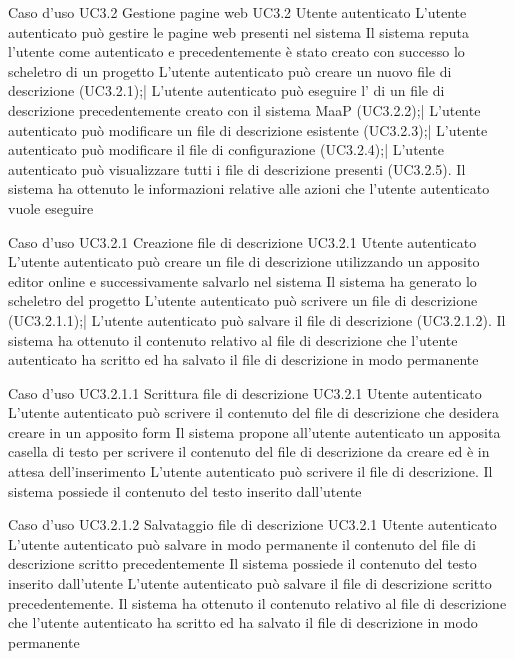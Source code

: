 \UCtitle
{Caso d'uso UC3.2}
{Gestione pagine web}
\UC
{UC3.2}
{Utente autenticato}
{L'utente autenticato può gestire le pagine web presenti nel sistema}
{Il sistema reputa l'utente come autenticato e precedentemente è stato creato con successo lo scheletro di un progetto}
\scenario
{L'utente autenticato può creare un nuovo file di descrizione (UC3.2.1);|
L'utente autenticato può eseguire l' di un file di descrizione precedentemente creato con il sistema MaaP (UC3.2.2);|
L'utente autenticato può modificare un file di descrizione esistente (UC3.2.3);|
L'utente autenticato può modificare il file di configurazione (UC3.2.4);|
L'utente autenticato può visualizzare tutti i file di descrizione presenti (UC3.2.5).
}
\post
{Il sistema ha ottenuto le informazioni relative alle azioni che l'utente autenticato vuole eseguire}


\UCtitle
{Caso d'uso UC3.2.1}
{Creazione file di descrizione}
\UC
{UC3.2.1}
{Utente autenticato}
{L'utente autenticato può creare un file di descrizione utilizzando un apposito editor online e successivamente salvarlo nel sistema}
{Il sistema ha generato lo scheletro del progetto}
\scenario
{L'utente autenticato può scrivere un file di descrizione (UC3.2.1.1);|
L'utente autenticato può salvare il file di descrizione (UC3.2.1.2).
}
\post
{Il sistema ha ottenuto il contenuto relativo al file di descrizione che l'utente autenticato ha scritto ed ha salvato il file di descrizione in modo permanente}

\UCtitle
{Caso d'uso UC3.2.1.1}
{Scrittura file di descrizione}
\UC
{UC3.2.1}
{Utente autenticato}
{L'utente autenticato può scrivere il contenuto del file di descrizione che desidera creare in un apposito form}
{Il sistema propone all'utente autenticato un apposita casella di testo per scrivere il contenuto del file di descrizione da creare ed è in attesa dell'inserimento}
\scenario
{L'utente autenticato può scrivere il file di descrizione.}
\post
{Il sistema possiede il contenuto del testo inserito dall'utente}

\UCtitle
{Caso d'uso UC3.2.1.2}
{Salvataggio file di descrizione}
\UC
{UC3.2.1}
{Utente autenticato}
{L'utente autenticato può salvare in modo permanente il contenuto del file di descrizione scritto precedentemente}
{Il sistema possiede il contenuto del testo inserito dall'utente}
\scenario
{L'utente autenticato può salvare il file di descrizione scritto precedentemente.}
\post
{Il sistema ha ottenuto il contenuto relativo al file di descrizione che l'utente autenticato ha scritto ed ha salvato il file di descrizione in modo permanente}

